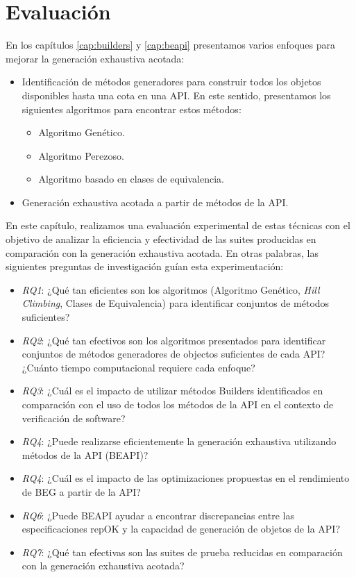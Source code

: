 \chapter[Evaluaci\'on]{Evaluaci\'on}
\label{cap:evaluation}



En los capítulos \ref{cap:builders} y \ref{cap:beapi} presentamos varios enfoques para mejorar la generación exhaustiva acotada:

\begin{itemize}
\item Identificación de métodos generadores para construir todos los objetos disponibles hasta una cota en una API. En este sentido, presentamos los siguientes algoritmos para encontrar estos métodos:
\begin{itemize}
\item Algoritmo Genético.
\item Algoritmo Perezoso.
\item Algoritmo basado en clases de equivalencia.
\end{itemize}
\item Generación exhaustiva acotada a partir de métodos de la API.
\end{itemize}

En este capítulo, realizamos una evaluación experimental de estas técnicas con el objetivo de analizar la eficiencia y efectividad de las suites producidas en comparación con la generación exhaustiva acotada. En otras palabras, las siguientes preguntas de investigación guían esta experimentación:

\begin{itemize}
\item \emph{RQ1}: ¿Qué tan eficientes son los algoritmos (Algoritmo Genético, \emph{Hill Climbing}, Clases de Equivalencia) para identificar conjuntos de métodos suficientes? 
\item \emph{RQ2}: ¿Qué tan efectivos son los algoritmos presentados para identificar conjuntos de métodos generadores de objectos suficientes de cada API?
¿Cuánto tiempo computacional requiere cada enfoque?
\item \emph{RQ3}: ¿Cuál es el impacto de utilizar métodos Builders identificados en comparación con el uso de todos los métodos de la API en el contexto de verificación de software?
\item \emph{RQ4}: ¿Puede realizarse eficientemente la generación exhaustiva utilizando métodos de la API (BEAPI)?
\item\emph{RQ4}: ¿Cuál es el impacto de las optimizaciones propuestas en el rendimiento de BEG a partir de la API?
\item\emph{RQ6}: ¿Puede BEAPI ayudar a encontrar discrepancias entre las especificaciones repOK y la capacidad de generación de objetos de la API?
\item\emph{RQ7}: ¿Qué tan efectivas son las suites de prueba reducidas en comparación con la generación exhaustiva acotada?
\end{itemize}

